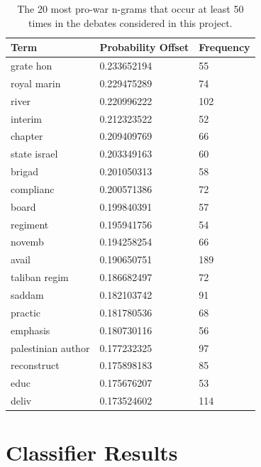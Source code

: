 \documentclass[12pt,a4paper,twoside,openright]{report}
\begin{document}
\begin{table}[]
	\centering
	\begin{tabular}{lll}
		\hline
		\textbf{Term} & \textbf{Probability Offset} & \textbf{Frequency} \\ \hline
		grate hon&0.233652194&55\\
		royal marin&0.229475289&74\\
		river&0.220996222&102\\
		interim&0.212323522&52\\
		chapter&0.209409769&66\\
		state israel&0.203349163&60\\
		brigad&0.201050313&58\\
		complianc&0.200571386&72\\
		board&0.199840391&57\\
		regiment&0.195941756&54\\
		novemb&0.194258254&66\\
		avail&0.190650751&189\\
		taliban regim&0.186682497&72\\
		saddam&0.182103742&91\\
		practic&0.181780536&68\\
		emphasis&0.180730116&56\\
		palestinian author&0.177232325&97\\
		reconstruct&0.175898183&85\\
		educ&0.175676207&53\\
		deliv&0.173524602&114\\ \hline
	\end{tabular}
	\caption{The 20 most pro-war n-grams that occur at least 50 times in the debates considered in this project.}
	\label{table:pro-grams}	
\end{table}
\section{Classifier Results} \label{eval-results}
\end{document}
